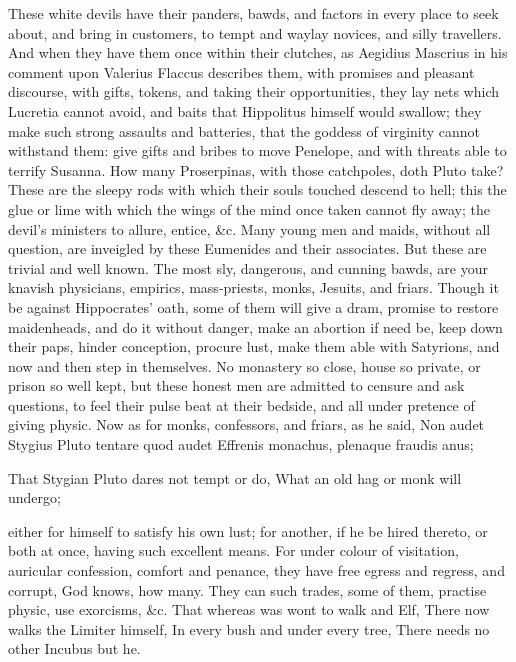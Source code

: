 {These white devils have their panders, bawds, and factors in every
place to seek about, and bring in customers, to tempt and waylay
novices, and silly travellers. And when they have them once within
their clutches, as Aegidius Mascrius in his comment upon Valerius
Flaccus describes them, with promises and pleasant discourse,
with gifts, tokens, and taking their opportunities, they lay nets which
Lucretia cannot avoid, and baits that Hippolitus himself would swallow;
they make such strong assaults and batteries, that the goddess of
virginity cannot withstand them: give gifts and bribes to move
Penelope, and with threats able to terrify Susanna. How many
Proserpinas, with those catchpoles, doth Pluto take? These are the
sleepy rods with which their souls touched descend to hell; this the
glue or lime with which the wings of the mind once taken cannot fly
away; the devil's ministers to allure, entice, \&c. Many young men and
maids, without all question, are inveigled by these Eumenides and their
associates. But these are trivial and well known. The most sly,
dangerous, and cunning bawds, are your knavish physicians, empirics,
mass-priests, monks,  Jesuits, and friars. Though it be against
Hippocrates' oath, some of them will give a dram, promise to restore
maidenheads, and do it without danger, make an abortion if need be,
keep down their paps, hinder conception, procure lust, make them able
with Satyrions, and now and then step in themselves. No monastery so
close, house so private, or prison so well kept, but these honest men
are admitted to censure and ask questions, to feel their pulse beat at
their bedside, and all under pretence of giving physic. Now as for
monks, confessors, and friars, as he said,
Non audet Stygius Pluto tentare quod audet
Effrenis monachus, plenaque fraudis anus;

That Stygian Pluto dares not tempt or do,
What an old hag or monk will undergo;

either for himself to satisfy his own lust; for another, if he be hired
thereto, or both at once, having such excellent means. For under colour
of visitation, auricular confession, comfort and penance, they have
free egress and regress, and corrupt, God knows, how many. They can
such trades, some of them, practise physic, use exorcisms, \&c.
That whereas was wont to walk and Elf,
There now walks the Limiter himself,
In every bush and under every tree,
There needs no other Incubus but he.

}
